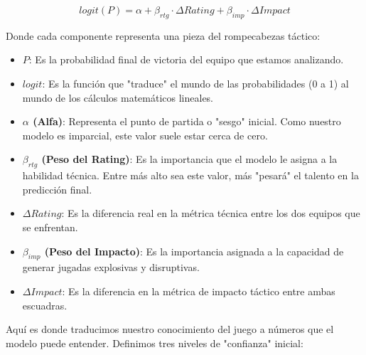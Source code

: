 \documentclass[twocolumn,10pt]{article}
\begin{document}
\begin{equation}
logit(P) = \alpha + \beta_{rtg} \cdot \Delta Rating + \beta_{imp} \cdot \Delta Impact
\end{equation}

Donde cada componente representa una pieza del rompecabezas táctico:
\begin{itemize}
    \item \textbf{$P$}: Es la probabilidad final de victoria del equipo que estamos analizando.
    \item \textbf{$logit$}: Es la función que "traduce" el mundo de las probabilidades (0 a 1) al mundo de los cálculos matemáticos lineales.
    \item \textbf{$\alpha$ (Alfa)}: Representa el punto de partida o "sesgo" inicial. Como nuestro modelo es imparcial, este valor suele estar cerca de cero.
    \item \textbf{$\beta_{rtg}$ (Peso del Rating)}: Es la importancia que el modelo le asigna a la habilidad técnica. Entre más alto sea este valor, más "pesará" el talento en la predicción final.
    \item \textbf{$\Delta Rating$}: Es la diferencia real en la métrica técnica entre los dos equipos que se enfrentan.
    \item \textbf{$\beta_{imp}$ (Peso del Impacto)}: Es la importancia asignada a la capacidad de generar jugadas explosivas y disruptivas.
    \item \textbf{$\Delta Impact$}: Es la diferencia en la métrica de impacto táctico entre ambas escuadras.
\end{itemize}

Aquí es donde traducimos nuestro conocimiento del juego a números que el modelo puede entender. Definimos tres niveles de "confianza" inicial:
\end{document}
